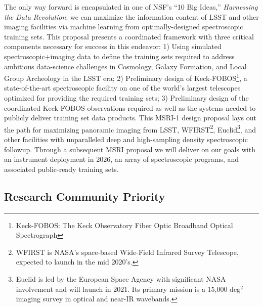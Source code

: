 \documentclass[oneside,11pt]{amsart}
\newcommand{\comment}[2][todo]{{\color{#1}[[{\bf #2}]]}}
\begin{document}
The only way forward is encapsulated in one of NSF's ``10 Big Ideas,''  \emph{Harnessing the Data Revolution}: we can maximize the information content of LSST and other imaging facilities via machine learning from
optimally-designed spectroscopic training sets.  This proposal presents a coordinated framework with three critical
components necessary for success in this endeavor: 1) Using simulated spectroscopic$+$imaging data to define the
training sets required to address ambitious data-science challenges in Cosmology, Galaxy Formation, and Local Group
Archeology in the LSST era; 2) Preliminary design of Keck-FOBOS\footnote{Keck-FOBOS: The Keck Observatory Fiber Optic
Broadband Optical Spectrograph}, a state-of-the-art spectroscopic facility on one of the world's largest telescopes
optimized for providing the required training sets; 3) Preliminary design of the coordinated Keck-FOBOS observations
required as well as the systems needed to publicly deliver training set data products.  This MSRI-1 design proposal
lays out the path for maximizing panoramic imaging from LSST, WFIRST\footnote{WFIRST is NASA's space-based Wide-Field
Infrared Survey Telescope, expected to launch in the mid 2020's.}, Euclid\footnote{Euclid is led by the European Space
Agency with significant NASA involvement and will launch in 2021. Its primary mission is a 15,000 deg$^2$ imaging
survey in optical and near-IR wavebands.}, and other facilities with unparalleled deep and high-sampling density
spectroscopic followup.  Through a subsequent MSRI proposal we will deliver on our goals with an instrument deployment
in 2026, an array of spectroscopic programs, and associated public-ready training sets.







\subsection{Research Community Priority} 
\label{sec:community}
\end{document}
